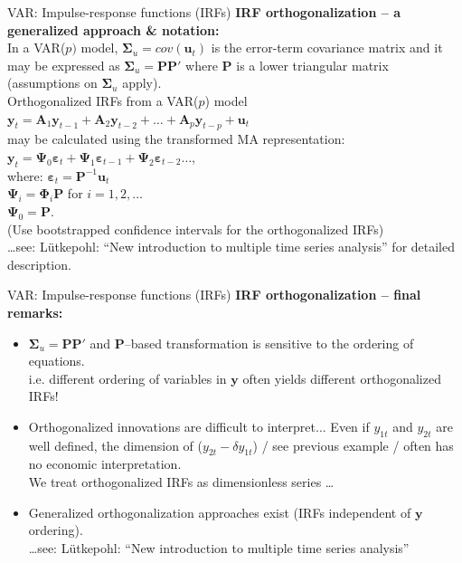 \documentclass[usenames,dvipsnames]{beamer}
\begin{document}
\begin{frame}{VAR: Impulse-response functions (IRFs)}
\small
\textbf{IRF orthogonalization – a generalized approach \& notation:}\\
\bigskip
In a VAR($p)$ model, $\bm{\Sigma}_u = \textit{cov}(\bm{u}_t)$ is the error-term covariance matrix and it may be expressed as $\bm{\Sigma}_u =\bm{PP'}$ where $\bm{P}$ is a lower triangular matrix (assumptions on $\bm{\Sigma}_u$ apply).\\
\medskip
Orthogonalized IRFs from a VAR($p$) model $\bm{y}_t = \bm{A}_1 \bm{y}_{t-1} + \bm{A}_2 \bm{y}_{t-2} + \dots + \bm{A}_p \bm{y}_{t-p} + \bm{u}_t$ \\may be calculated using the transformed MA representation:\\
\medskip
$\bm{y}_t = \bm{\Psi}_0 \bm{\varepsilon}_t + \bm{\Psi}_1 \bm{\varepsilon}_{t-1} + \bm{\Psi}_2 \bm{\varepsilon}_{t-2} \dots$, \\
\medskip
where: $\bm{\varepsilon}_t = \bm{P}^{-1} \bm{u}_t$\\
\hspace*{9mm} $\bm{\Psi}_i = \bm{\Phi}_i \bm{P}$ for $i=1,2,\dots$\\
\hspace*{8.7mm} $\bm{\Psi}_0 = \bm{P}$. \\
\medskip
(Use bootstrapped confidence intervals for the orthogonalized IRFs)\\
\dots see: Lütkepohl: ``New introduction to multiple time series analysis'' for detailed description. 
\end{frame}
\begin{frame}{VAR: Impulse-response functions (IRFs)}
\textbf{IRF orthogonalization – final remarks:}\\
\medskip
\begin{itemize}
\item $\bm{\Sigma}_u = \bm{PP'}$ and $\bm{P}$–based transformation is sensitive to the ordering of equations.\\
i.e. different ordering of variables in $\bm{y}$ often yields different orthogonalized IRFs! \\
\medskip
\item Orthogonalized innovations are difficult to interpret... Even if $y_{1t}$ and $y_{2t}$ are well defined, the dimension of ($y_{2t}-\delta y_{1t}$) / see previous example / often has no economic interpretation.\\
\medskip
We treat orthogonalized IRFs as dimensionless series \dots \\
\medskip
\item Generalized orthogonalization approaches exist (IRFs independent of $\bm{y}$ ordering). \\
\dots see: Lütkepohl: ``New introduction to multiple time series analysis''
\end{itemize}
\end{frame}
\end{document}
